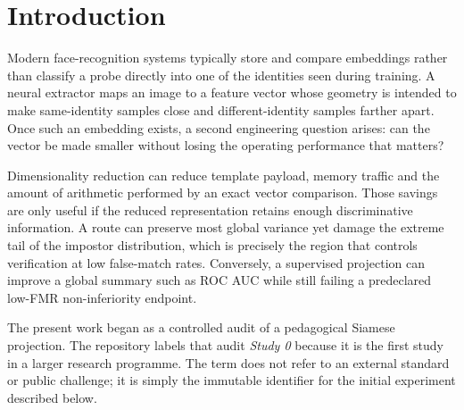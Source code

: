 \documentclass[10pt,a4paper]{article}
\newcommand{\fnmr}{\mathrm{FNMR}}
\newcommand{\DeltaFNMR}{\Delta_{\fnmr}}
\begin{document}
\begin{abstract}
The corrected result is negative but bounded: random projection, PCA and the Siamese route
all pass the non-inferiority rule on 0 of 5 seeds. The 97.5\% upper bounds for
$\DeltaFNMR$ range from 0.112649--0.151768 for random projection,
0.125556--0.133606 for PCA, and 0.176584--0.189156 for the Siamese route, all above the
0.03 margin. Subject-level intervals are roughly 1.5 times wider than the original
pair-level intervals. The result does not prove that 128-dimensional compression is
intrinsically inferior, nor that metric learning is ineffective. It establishes only that
preservation and added supervision value were not demonstrated in this frozen experiment.
A practical lesson follows: use low-cost, non-claim-bearing screening to decide whether a
direction merits full qualification, then escalate the evidence burden only when a result is
promoted toward a scientific claim.
\end{abstract}

\section{Introduction}

Modern face-recognition systems typically store and compare embeddings rather than classify
a probe directly into one of the identities seen during training. A neural extractor maps
an image to a feature vector whose geometry is intended to make same-identity samples close
and different-identity samples farther apart. Once such an embedding exists, a second
engineering question arises: can the vector be made smaller without losing the operating
performance that matters?

Dimensionality reduction can reduce template payload, memory traffic and the amount of
arithmetic performed by an exact vector comparison. Those savings are only useful if the
reduced representation retains enough discriminative information. A route can preserve
most global variance yet damage the extreme tail of the impostor distribution, which is
precisely the region that controls verification at low false-match rates. Conversely, a
supervised projection can improve a global summary such as ROC AUC while still failing a
predeclared low-FMR non-inferiority endpoint.

The present work began as a controlled audit of a pedagogical Siamese projection. The
repository labels that audit \emph{Study 0} because it is the first study in a larger
research programme. The term does not refer to an external standard or public challenge; it
is simply the immutable identifier for the initial experiment described below.
\end{document}
